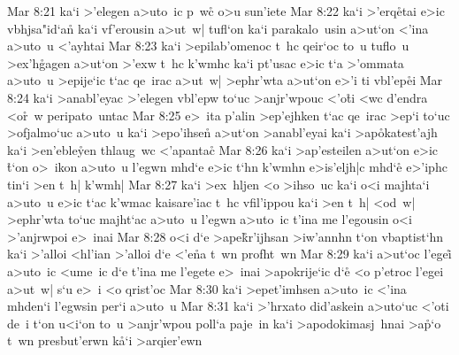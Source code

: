 \vs Mar 8:21
ka`i
>'elegen
a>uto~ic
p~wc\r{}
o>u
sun'iete\bibvsend
\vs Mar 8:22
ka`i
>'erq\r{e}tai
e>ic
vbhjsa"id`a\r{n}
ka`i
vf'erousin
a>ut~w|
tufl`on
ka`i
parakalo~usin
a>ut`on
<'ina
a>uto~u
<'ayhtai\bibvsend
\vs Mar 8:23
ka`i
>epilab'omenoc
t~hc
qeir`oc
to~u
tuflo~u
>ex'h\r{g}agen
a>ut`on
>'exw
t~hc
k'wmhc
ka`i
pt'usac
e>ic
t`a
>'ommata
a>uto~u
>epije`ic
t`ac
qe~irac
a>ut~w|
>ephr'wta
a>ut`on
e>'i
ti
vbl'ep\r{e}i\bibvsend
{}
\vs Mar 8:24
ka`i
>anabl'eyac
>'elegen
vbl'epw
to`uc
>anjr'wpouc
<'o\r{t}i
<wc
d'endra
<o\r{r}~w
peripato~untac\bibvsend
\vs Mar 8:25
e>~ita
p'alin
>ep'ejhken
t`ac
qe~irac
>ep`i
to`uc
>ofjalmo`uc
a>uto~u
ka`i
>epo'ihsen\r{}
a>ut`on
>anabl'eyai
ka`i
>ap\r{o}katest'ajh
ka`i
>en'eble\r{y}en
thlaug~wc
<'apanta\r{c}\bibvsend
{}
\vs Mar 8:26
ka`i
>ap'esteilen
a>ut`on
e>ic
\r{t}`on
o>~ikon
a>uto~u
l'egwn
mhd`e
e>ic
t`hn
k'wmhn
e>is'eljh|c
mhd`e\r{}
e>'iphc
tin`i
>en
t~h|
k'wmh|\bibvsend
\vs Mar 8:27
ka`i
>ex~hljen
<o
>ihso~uc
ka`i
o<i
majhta`i
a>uto~u
e>ic
t`ac
k'wmac
kaisare'iac
t~hc
vfil'ippou
ka`i
>en
t~h|
<od~w|
>ephr'wta
to`uc
majht`ac
a>uto~u
l'egwn
a>uto~ic
t'ina
me
l'egousin
o<i
>'anjrwpoi
e>~inai\bibvsend
\vs Mar 8:28
o<i
d`e
>ape\r{k}r'ijhsan
>iw'annhn
t`on
vbaptist`hn
ka`i
>'alloi
<hl'ian
>'alloi
d`e
<'e\r{n}a
t~wn
profht~wn\bibvsend
\vs Mar 8:29
ka`i
a>ut`oc
l'egei\r{}
a>uto~ic
<ume~ic
d`e
t'ina
me
l'egete
e>~inai
>apokrije`ic
d`e\r{}
<o
p'etroc
l'egei
a>ut~w|
s`u
e>~i
<o
qrist'oc\bibvsend
\vs Mar 8:30
ka`i
>epet'imhsen
a>uto~ic
<'ina
mhden`i
l'egwsin
per`i
a>uto~u\bibvsend
\vs Mar 8:31
ka`i
>'hrxato
did'askein
a>uto`uc
<'oti
de~i
t`on
u<i`on
to~u
>anjr'wpou
poll`a
paje~in
ka`i
>apodokimasj~hnai
>a\r{p}`o
t~wn
presbut'erwn
k\r{a}`i
>arqier'ewn
